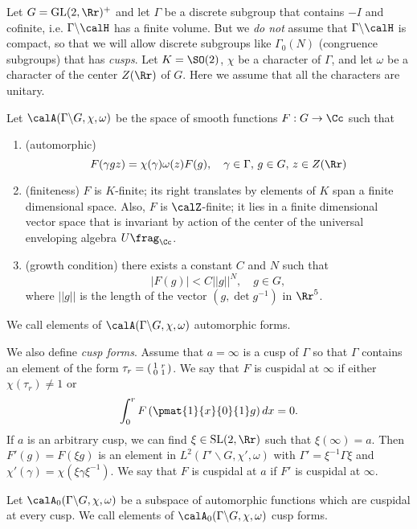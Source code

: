 Let $G = \GL(2, \Rr)^{+}$ and let $\Gamma$ be a discrete subgroup that contains $-I$ and cofinite, i.e. $\Gamma\backslash \calH$ has a finite volume. But we \emph{do not} assume that $\Gamma\backslash \calH$ is compact, so that we will allow discrete subgroups like $\Gamma_{0}(N)$ (congruence subgroups) that has \emph{cusps}. Let $K = \SO(2)$, $\chi$ be a character of $\Gamma$, and let $\omega$ be a character of the center $Z(\Rr)$ of $G$. 
Here we assume that all the characters are unitary. 



\begin{definition}
Let $\calA(\Gamma\backslash G, \chi, \omega)$ be the space of smooth functions $F:G\to \Cc$ such that 
\begin{enumerate}
\item (automorphic) $$F(\gamma gz) = \chi(\gamma)\omega(z)F(g), \quad \gamma\in \Gamma, \, g\in G, \, z\in Z(\Rr)$$
\item (finiteness) $F$ is $K$-finite; its right translates by elements of $K$ span a finite dimensional space. Also, $F$ is $\calZ$-finite; it lies in a finite dimensional vector space that is invariant by action of the center of the universal enveloping algebra $U\frag_{\Cc}$.  
\item (growth condition) there exists a constant $C$ and $N$ such that $$|F(g)|  < C||g||^{N}, \quad g\in G,$$where $||g||$ is the length of the vector $(g, \det g^{-1})$ in $\Rr^{5}$. 
\end{enumerate}
We call elements of $\calA(\Gamma\backslash G, \chi, \omega)$ automorphic forms. 
\end{definition}

We also define \emph{cusp forms}. Assume that $a = \infty$ is a cusp of $\Gamma$ so that $\Gamma$ contains an element of the form $\tau_{r} = \left(\begin{smallmatrix} 1 & r \\ 0 & 1 \end{smallmatrix}\right)$. We say that $F$ is cuspidal at $\infty$ if either $\chi(\tau_{r})\neq 1$ or 
$$
\int_{0}^{r} F\left( \pmat{1}{x}{0}{1}g \right) dx = 0. 
$$
If $a$ is an arbitrary cusp, we can find $\xi\in \SL(2, \Rr)$ such that $\xi(\infty) = a$. 
Then $F'(g) = F(\xi g)$ is an element in $L^{2}(\Gamma'\backslash G, \chi', \omega)$ with $\Gamma' = \xi^{-1}\Gamma\xi$ and $\chi'(\gamma) = \chi(\xi\gamma\xi^{-1})$. We say that $F$ is cuspidal at $a$ if $F'$ is cuspidal at $\infty$. 

\begin{definition}
Let $\calA_{0}(\Gamma\backslash G, \chi, \omega)$ be a subspace of automorphic functions which are cuspidal at every cusp. We call elements of $\calA_{0}(\Gamma\backslash G, \chi, \omega)$ cusp forms. 
\end{definition}


